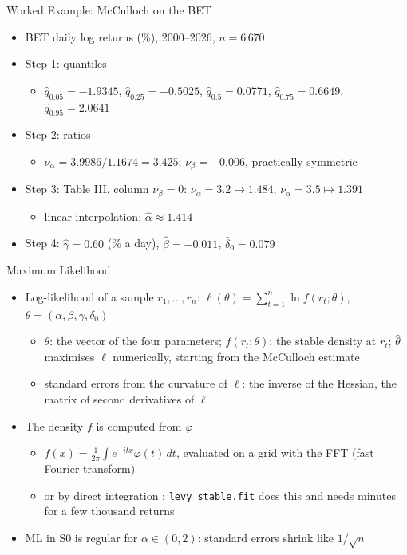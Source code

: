 \begin{frame}{Worked Example: McCulloch on the BET}
\itemsize{\small}
\begin{itemize}
    \item BET daily log returns (\%), 2000--2026, $n = 6\,670$
    \item Step 1: quantiles
    \begin{itemize}
        \item $\hat q_{0.05} = -1.9345$, $\hat q_{0.25} = -0.5025$, $\hat q_{0.5} = 0.0771$, $\hat q_{0.75} = 0.6649$, $\hat q_{0.95} = 2.0641$
    \end{itemize}
    \item Step 2: ratios
    \begin{itemize}
        \item $\nu_\alpha = 3.9986/1.1674 = 3.425$; $\nu_\beta = -0.006$, practically symmetric
    \end{itemize}
    \item Step 3: Table III, column $\nu_\beta = 0$: $\nu_\alpha = 3.2 \mapsto 1.484$, $\nu_\alpha = 3.5 \mapsto 1.391$
    \begin{itemize}
        \item linear interpolation: $\hat\alpha \approx 1.414$
    \end{itemize}
    \item Step 4: $\hat\gamma = 0.60$ (\% a day), $\hat\beta = -0.011$, $\hat\delta_0 = 0.079$
\end{itemize}
\end{frame}

\begin{frame}{Maximum Likelihood}
\itemsize{\small}
\begin{itemize}
    \item Log-likelihood of a sample $r_1, \dots, r_n$: $\ell(\theta) = \sum_{t=1}^n \ln f(r_t; \theta)$, $\theta = (\alpha, \beta, \gamma, \delta_0)$
    \begin{itemize}
        \item $\theta$: the vector of the four parameters; $f(r_t; \theta)$: the stable density at $r_t$; $\hat\theta$ maximises $\ell$ numerically, starting from the McCulloch estimate
        \item standard errors from the curvature of $\ell$: the inverse of the Hessian, the matrix of second derivatives of $\ell$
    \end{itemize}
    \item The density $f$ is computed from $\varphi$
    \begin{itemize}
        \item $f(x) = \frac{1}{2\pi}\int e^{-itx}\varphi(t)\,dt$, evaluated on a grid with the FFT (fast Fourier transform) 
        \item or by direct integration ; \texttt{levy\_stable.fit} does this and needs minutes for a few thousand returns
    \end{itemize}
    \item ML in S0 is regular for $\alpha \in (0, 2)$: standard errors shrink like $1/\sqrt{n}$ 
\end{itemize}
\end{frame}

